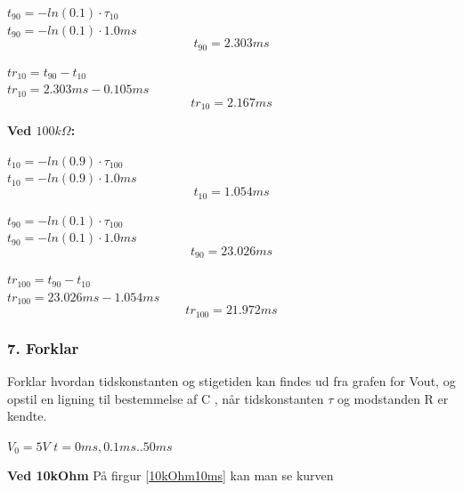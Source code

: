 \begin{center}
$t_{90}=-ln(0.1)\cdot \tau_{10}$\\
$t_{90}=-ln(0.1)\cdot 1.0 ms$
\begin{equation}
t_{90}= 2.303 ms
\label{t_10_90}
\end{equation}
\end{center}


\begin{center}
$tr_{10}=t_{90} - t_{10}$\\
$tr_{10}=2.303 ms - 0.105 ms$
\begin{equation}
tr_{10}= 2.167 ms
\label{tr_10}
\end{equation}
\end{center}


\textbf{Ved $100k\Omega$:}\\
\begin{center}
$t_{10}=-ln(0.9)\cdot \tau_{100}$\\
$t_{10}=-ln(0.9)\cdot 1.0 ms$
\begin{equation}
t_{10}= 1.054 ms
\label{t_100_10}
\end{equation}
\end{center}


\begin{center}
$t_{90}=-ln(0.1)\cdot \tau_{100}$\\
$t_{90}=-ln(0.1)\cdot 1.0 ms$
\begin{equation}
t_{90}= 23.026 ms
\label{t_100_90}
\end{equation}
\end{center}


\begin{center}
$tr_{100}=t_{90} - t_{10}$\\
$tr_{100}=23.026 ms - 1.054 ms$
\begin{equation}
tr_{100}= 21.972 ms
\label{tr_100}
\end{equation}
\end{center}
 

\subsubsection*{7. Forklar}
Forklar hvordan tidskonstanten og stigetiden kan findes ud fra grafen for 	Vout, og opstil en ligning til bestemmelse af C , når tidskonstanten  $\tau$ og modstanden R er kendte.

$V_{0}=5V$
$t=0ms,0.1ms..50ms$


\textbf{Ved 10kOhm}
På firgur \ref{10kOhm10ms} kan man se kurven





